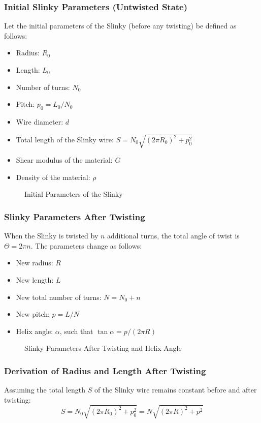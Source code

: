 \documentclass{mcmthesis}  %
\begin{document}
\subsubsection{Initial Slinky Parameters (Untwisted State)}
Let the initial parameters of the Slinky (before any twisting) be defined as follows:
\begin{itemize}
    \item Radius: \(R_0\)
    \item Length: \(L_0\)
    \item Number of turns: \(N_0\)
    \item Pitch: \(p_0 = L_0 / N_0\)
    \item Wire diameter: \(d\)
    \item Total length of the Slinky wire: \(S = N_0 \sqrt{(2\pi R_0)^2 + p_0^2}\)
    \item Shear modulus of the material: \(G\)
    \item Density of the material: \(\rho\)
\end{itemize}

\begin{figure}[h!]
    \centering
    \caption{Initial Parameters of the Slinky}
    \label{fig:initial_params}
\end{figure}

\subsubsection{Slinky Parameters After Twisting}
When the Slinky is twisted by \(n\) additional turns, the total angle of twist is \(\Theta = 2\pi n\). The parameters change as follows:
\begin{itemize}
    \item New radius: \(R\)
    \item New length: \(L\)
    \item New total number of turns: \(N = N_0 + n\)
    \item New pitch: \(p = L / N\)
    \item Helix angle: \(\alpha\), such that \(\tan \alpha = p / (2\pi R)\)
\end{itemize}

\begin{figure}[h!]
    \centering
    \caption{Slinky Parameters After Twisting and Helix Angle}
    \label{fig:twisted_params}
\end{figure}

\subsubsection{Derivation of Radius and Length After Twisting}
Assuming the total length \(S\) of the Slinky wire remains constant before and after twisting:
\[ S = N_0 \sqrt{(2\pi R_0)^2 + p_0^2} = N \sqrt{(2\pi R)^2 + p^2} \]
\end{document}
